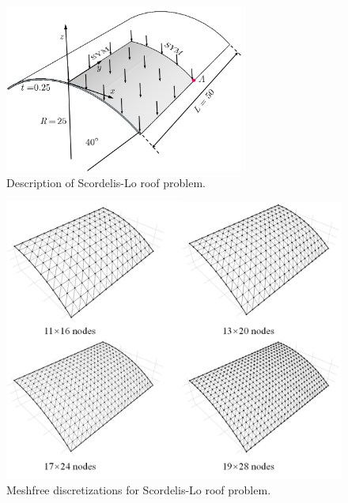 \begin{figure}[!ht]
\centering
\includegraphics[width=0.7\textwidth]{figures/slm}
\caption{Description of Scordelis-Lo roof problem.}\label{slf1}
\end{figure}
\begin{figure}[!ht]
\centering
\includegraphics[width=\textwidth]{figures/slmsh}
\caption{Meshfree discretizations for Scordelis-Lo roof problem.}\label{slf2}
\end{figure}
